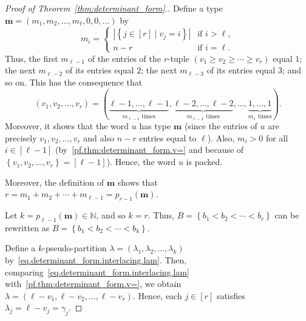 \documentclass[reqno]{amsart}
\newcommand{\0}{\phantom{c}}
\newcommand{\mm}{\mathbf{m}}
\newcommand{\NN}{\mathbb{N}}
\newcommand{\set}[1]{\left\{ #1 \right\}}
\newcommand{\abs}[1]{\left| #1 \right|}
\newcommand{\tup}[1]{\left( #1 \right)}
\newcommand{\ive}[1]{\left[ #1 \right]}
\theoremstyle{plain}
\theoremstyle{definition}
\numberwithin{equation}{section}
\begin{document}
\begin{proof}[Proof of Theorem~\ref{thm:determinant_form}.]
Define a type $\mm = \tup{m_1, m_2, \dotsc, m_{\ell}, 0, 0, \ldots}$ by
\[
m_i =
  \begin{cases}
  \abs{ \set{ j \in \ive{r} \mid v_j = i}} & \text{if } i > \ell,\\
  n - r & \text{if } i = \ell.
  \end{cases}
\]
Thus, the first $m_{\ell-1}$ of the entries of the $r$-tuple $\tup{v_1 \geq v_2 \geq \cdots \geq v_r}$ equal $1$; the next $m_{\ell-2}$ of its entries equal $2$; the next $m_{\ell-3}$ of its entries equal $3$; and so on.
This has the consequence that
\begin{equation}
\label{pf.thm:determinant_form.v=}
\tup{v_1, v_2, \dotsc, v_r} = (
  \underbrace{\ell-1,\ldots,\ell-1}_{m_{\ell-1}\text{ times}},
  \underbrace{\ell-2,\ldots,\ell-2}_{m_{\ell-2}\text{ times}},
  \dotsc,
  \underbrace{1,\ldots,1}_{m_1\text{ times}}
).
\end{equation}
Moreover, it shows that the word $u$ has type $\mm$ (since the entries of $u$ are precisely $v_1, v_2, \dotsc, v_r$ and also $n-r$ entries equal to $\ell$).
Also, $m_i > 0$ for all $i \in \ive{\ell-1}$ (by~\eqref{pf.thm:determinant_form.v=} and because of $\set{v_1, v_2, \dotsc, v_r} = \ive{\ell-1}$).
Hence, the word $u$ is packed.

Moreover, the definition of $\mm$ shows that $r = m_1 + m_2 + \cdots + m_{\ell-1} = p_{r-1}(\mm)$.

Let $k = p_{\ell-1}(\mm) \in \NN$, and so $k = r$.
Thus, $B = \set{b_1 < b_2 < \cdots < b_r}$ can be rewritten as $B = \set{b_1 < b_2 < \cdots < b_k}$.

Define a $k$-pseudo-partition $\lambda = \tup{\lambda_1,\lambda_2, \dotsc, \lambda_k}$ by~\eqref{eq.determinant_form.interlacing.lam}.
Then, comparing~\eqref{eq.determinant_form.interlacing.lam} with~\eqref{pf.thm:determinant_form.v=}, we obtain $\lambda = \tup{\ell-v_1, \ell-v_2, \dotsc, \ell-v_r}$.
Hence, each $j \in \ive{r}$ satisfies $\lambda_j = \ell - v_j = \gamma_j$.


\end{proof}
\end{document}
